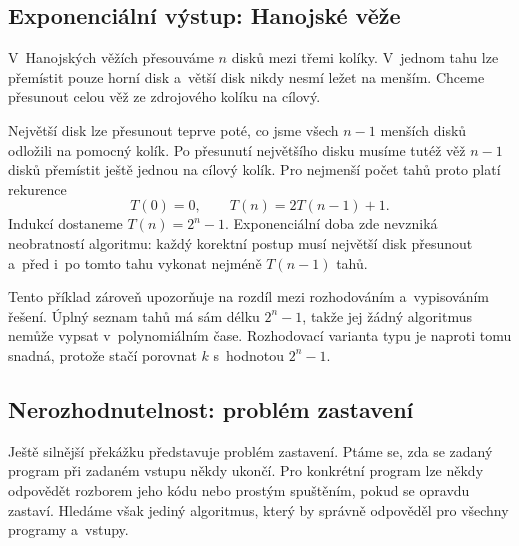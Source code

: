 \subsection{Exponenciální výstup: Hanojské věže}

V~Hanojských věžích přesouváme \(n\) disků mezi třemi kolíky. V~jednom tahu lze přemístit pouze horní disk a~větší disk nikdy nesmí ležet na menším. Chceme přesunout celou věž ze zdrojového kolíku na cílový.

Největší disk lze přesunout teprve poté, co jsme všech \(n-1\) menších disků odložili na pomocný kolík. Po přesunutí největšího disku musíme tutéž věž \(n-1\) disků přemístit ještě jednou na cílový kolík. Pro nejmenší počet tahů proto platí rekurence
\[
    T(0)=0,
    \qquad
    T(n)=2T(n-1)+1.
\]
Indukcí dostaneme \(T(n)=2^n-1\). Exponenciální doba zde nevzniká neobratností algoritmu: každý korektní postup musí největší disk přesunout a~před i~po tomto tahu vykonat nejméně \(T(n-1)\) tahů.

\begin{algorithm}
    \caption{\textsc{hanoi}}
    \label{alg:hanoi}
\end{algorithm}

Tento příklad zároveň upozorňuje na rozdíl mezi rozhodováním a~vypisováním řešení. Úplný seznam tahů má sám délku \(2^n-1\), takže jej žádný algoritmus nemůže vypsat v~polynomiálním čase. Rozhodovací varianta typu  je naproti tomu snadná, protože stačí porovnat \(k\) s~hodnotou \(2^n-1\).

\subsection{Nerozhodnutelnost: problém zastavení}

Ještě silnější překážku představuje problém zastavení. Ptáme se, zda se zadaný program při zadaném vstupu někdy ukončí. Pro konkrétní program lze někdy odpovědět rozborem jeho kódu nebo prostým spuštěním, pokud se opravdu zastaví. Hledáme však jediný algoritmus, který by správně odpověděl pro všechny programy a~vstupy.


